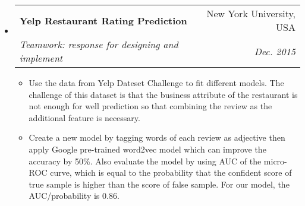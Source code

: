 \documentclass[a4paper,10pt]{article}
\makeatletter
\newcommand{\resitem}[1]{\item #1 \vspace{-2pt}}
\renewcommand{\normalsize}{\fontsize{12pt}{\baselineskip}\selectfont}
\newcommand{\ressubheading}[4]{
	\begin{tabular*}{6.5in}{l@{\extracolsep{\fill}}r}
		\textbf{#1} & #2 \\
		\textit{#3} & \textit{#4} \\
	\end{tabular*}\vspace{-6pt}}
\makeatother
\begin{document}
\begin{itemize}
				\item \ressubheading{{\normalsize Yelp Restaurant Rating Prediction}}{New York University, USA}{\normalsize Teamwork: response for designing and implement}{Dec. 2015}
				
					\begin{itemize}
						\resitem{Use the data from Yelp Dateset Challenge to fit different models. The challenge of this dataset is that the business attribute of the restaurant is not enough for well prediction so that combining the review as the additional feature is necessary.}
						\resitem{Create a new model by tagging words of each review as adjective then apply Google pre-trained word2vec model which can improve the accuracy by 50\%. Also evaluate the model by using AUC of the micro-ROC curve, which is equal to the probability that the confident score of true sample is higher than the score of false sample. For our model, the AUC/probability is 0.86.}
					\end{itemize}
			

			
		\end{itemize}
		
\end{document}
